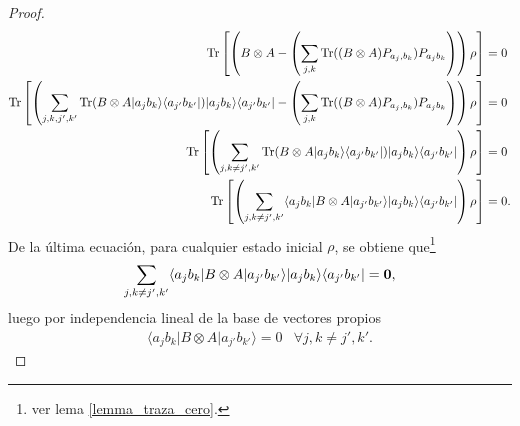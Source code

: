 \documentclass[12pt,oneside]{book}\raggedbottom{}
\begin{document}
\begin{proof}
\[\begin{split}
	{\rm Tr}\left[\left(B\otimes A-\left(\sum_{j,k}{\rm Tr}((B\otimes A) P_{a_j,b_k})P_{a_j b_k}\right)\right)\rho\right]&=0\\
{\rm Tr}\left[\left(\sum_{j,k,j',k'}{\rm Tr}(B\otimes A |a_j b_k\rangle \langle a_{j'}b_{k'}|)|a_j b_k\rangle \langle a_{j'}b_{k'}|-\left(\sum_{j,k}{\rm Tr}((B\otimes A) P_{a_j,b_k})P_{a_j b_k}\right)\right)\rho\right]&=0\\
{\rm Tr}\left[\left(\sum_{j,k\ne j',k'}{\rm Tr}(B\otimes A |a_j b_k\rangle \langle a_{j'}b_{k'}|)|a_j b_k\rangle \langle a_{j'}b_{k'}|\right)\rho\right]&=0\\
{\rm Tr}\left[\left(\sum_{j,k\ne j',k'}  \langle a_j b_k |B\otimes A|a_{j'}b_{k'}\rangle |a_j b_k\rangle \langle a_{j'}b_{k'}|\right)\rho\right]&=0.\\
\end{split}\]
De la última ecuación, para cualquier estado inicial $\rho$, se obtiene que\footnote[1]{ver lema {\ref{lemma_traza_cero}}.} 
\[\sum_{j,k\ne j', k'} \langle a_j b_k |B\otimes A|a_{j'}b_{k'}\rangle |a_j b_k\rangle \langle a_{j'}b_{k'}|=\mathbf{0},\] luego por independencia lineal de la base de vectores propios  
 \[\begin{array}{cc}
	\langle a_j b_k |B\otimes A|a_{j'}b_{k'}\rangle=0& \forall j,k\ne j',k'.\end{array}\]

	








\begin{comment}
	De ello  \[B\otimes A=\sum_{j,k} \tr((B\otimes A)P_{a_j, b_k})P_{a_j, b_k}=\sum_{j,k}d_{j,k}P_{a_j,b_k},\] notemos que
\[\begin{split}[A\otimes B, B\otimes A ]&= A\otimes B (B\otimes A)-B\otimes A (A\otimes B)\\
&=(\sum_{j,k}a_j b_k P_{a_j, b_k})(\sum_{i,l} \tr((B\otimes A)P_{a_i, b_l})P_{a_i, b_l})\\
&- (\sum_{i,l} \tr((B\otimes A)P_{a_i, b_l})P_{a_j, b_k})(\sum_{j,k}a_j b_k P_{a_j, b_k})\\
&=\sum_{j,k,i,l}a_j b_k  \tr((B\otimes A)P_{a_i, b_l})P_{a_j, b_k}P_{a_i, b_l}\\
&- (\sum_{i,l,j,k} a_j b_k \tr((B\otimes A)P_{a_i, b_l})P_{a_i, b_l} P_{a_j, b_k})\\
&=\sum_{j,k}a_j b_k  \tr((B\otimes A)P_{a_j, b_k})-\sum_{i,l} a_i b_l \tr((B\otimes A)P_{a_i, b_l})=\mathbf{0}\\
\end{split}\]
\end{comment}






\end{proof}
\end{document}
